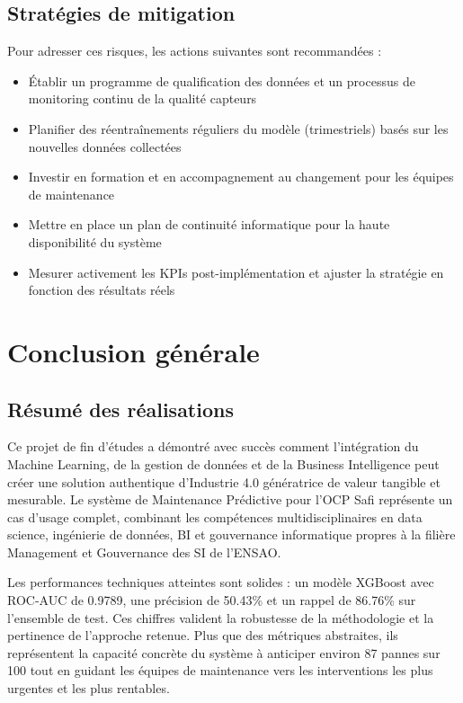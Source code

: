 \documentclass[a4paper,12pt]{report}
\begin{document}
\subsection{Stratégies de mitigation}

Pour adresser ces risques, les actions suivantes sont recommandées :

\begin{itemize}
    \item Établir un programme de qualification des données et un processus de monitoring continu de la qualité capteurs
    \item Planifier des réentraînements réguliers du modèle (trimestriels) basés sur les nouvelles données collectées
    \item Investir en formation et en accompagnement au changement pour les équipes de maintenance
    \item Mettre en place un plan de continuité informatique pour la haute disponibilité du système
    \item Mesurer activement les KPIs post-implémentation et ajuster la stratégie en fonction des résultats réels
\end{itemize}

\section{Conclusion générale}

\subsection{Résumé des réalisations}

Ce projet de fin d'études a démontré avec succès comment l'intégration du Machine Learning, de la gestion de données et de la Business Intelligence peut créer une solution authentique d'Industrie 4.0 génératrice de valeur tangible et mesurable. Le système de Maintenance Prédictive pour l'OCP Safi représente un cas d'usage complet, combinant les compétences multidisciplinaires en data science, ingénierie de données, BI et gouvernance informatique propres à la filière Management et Gouvernance des SI de l'ENSAO.

Les performances techniques atteintes sont solides : un modèle XGBoost avec ROC-AUC de 0.9789, une précision de 50.43\% et un rappel de 86.76\% sur l'ensemble de test. Ces chiffres valident la robustesse de la méthodologie et la pertinence de l'approche retenue. Plus que des métriques abstraites, ils représentent la capacité concrète du système à anticiper environ 87 pannes sur 100 tout en guidant les équipes de maintenance vers les interventions les plus urgentes et les plus rentables.
\end{document}
